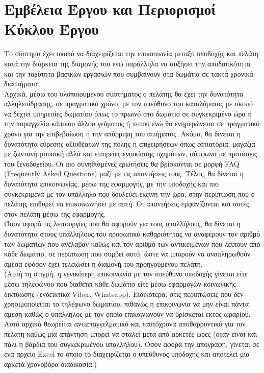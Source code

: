 \section{Εμβέλεια Έργου και Περιορισμοί Κύκλου Έργου}		
Το σύστημα έχει σκοπό να διαχειρίζεται την επικοινωνία μεταξύ υποδοχής και πελάτη κατά την διάρκεια 
της διαμονής του ενώ παράλληλα να αυξήσει την αποδοτικότητα και την ταχύτητα βασικών εργασιών 
που συμβαίνουν στα δωμάτια σε τακτά χρονικά διαστήματα.\\

\noindent
Αρχικά, μέσω του υλοποιούμενου συστήματος ο πελάτης θα έχει την δυνατότητα αλληλεπίδρασης, σε 
πραγματικό χρόνο, με τον υπεύθυνο του καταλύματος με σκοπό να δεχτεί υπηρεσίες δωματίου όπως το 
πρωινό στο δωμάτιο σε συγκεκριμένο ώρα ή την παραγγελία κάποιου άλλου γεύματος ή ποτού ενώ θα 
ενημερώνεται σε πραγματικό χρόνο για την επιβεβαίωση ή την απόρριψη του αιτήματος.  Ακόμα, θα 
δίνεται η δυνατότητα εύρεσης αξιοθέατων της πόλης ή επιχειρήσεων όπως εστιατόρια, μαγαζιά με 
ζωντανή μουσική αλλά και εταιρείες ενοικίασης οχημάτων, σύμφωνα με προτάσεις του ξενοδοχείου. Οι 
πιο συνηθισμένες ερωτήσεις θα βρίσκονται σε μορφή FAQ (Frequently Asked Questions) μαζί με τις 
απαντήσεις τους. Τέλος, θα δίνεται η δυνατότητα επικοινωνίας, μέσω της εφαρμογής, με την υποδοχής 
και πιο συγκεκριμένα με τον υπάλληλο που δουλεύει εκείνη την ώρα, στην περίπτωση που ο πελάτης 
επιθυμεί να επικοινωνήσει με αυτή. Οι απαντήσεις εμφανίζονται και αυτές στον πελάτη μέσω της 
εφαρμογής. \\

\noindent
Όσον αφορά τις λειτουργίες που θα αφορούν για τους υπαλλήλους, θα δίνεται η δυνατότητα στους 
υπάλληλους του προσωπικό καθαριότητας να αναφέρουν τον αριθμό των δωματίων που ανέλαβαν 
καθώς και τον αριθμό των αντικειμένων που λείπουν από κάθε δωμάτιο, σε περίπτωση που συμβεί αυτό, 
ώστε να μπορούν να αναπληρωθούν άμεσα εφόσον έχει τελειώσει η διαμονή του προηγούμενου πελάτη. 
\\

\noindent
(Αυτή τη στιγμή, η γενικότερη επικοινωνία με τον υπεύθυνο υποδοχής γίνεται είτε μέσω τηλεφώνου που 
διαθέτει κάθε δωμάτιο είτε μέσω εφαρμογών κοινωνικής δικτύωσης (ενδεικτικά Viber, Whatsapp). 
Ειδικότερα, στις περιπτώσεις που δεν χρησιμοποιείται το τηλέφωνο δωματίου, πιθανώς η επικοινωνία 
να μην είναι πάντα άμεση καθώς ο υπάλληλος με τον οποίο επικοινωνούν να βρίσκεται εκτός ωραρίου. 
Αυτό  αρχικά θεωρείται αντιεπαγγελματικό και ταυτόχρονα αποθαρρυντικό για τον πελάτη καθώς μία 
απάντηση μπορεί να σταλεί μετά από αρκετές ώρες (όταν είναι και πάλι η βάρδια του συγκεκριμένου 
υπαλλήλου). Όσον αφορά την απογραφή, γίνεται σε ένα αρχείο Excel το οποίο το  διαχειρίζεται ο 
υπεύθυνος υποδοχής και αποτελεί μία αρκετά χρονοβόρα διαδικασία.) \\

